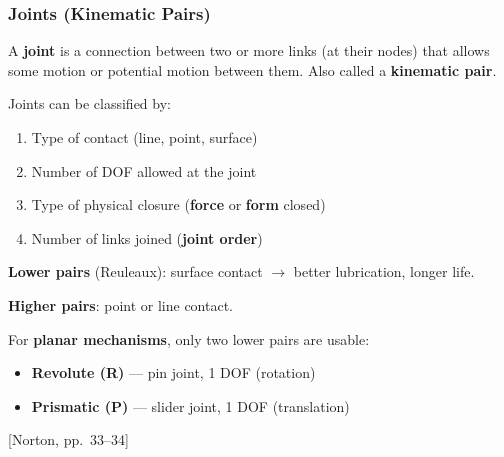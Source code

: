 \documentclass[10pt,aspectratio=43]{beamer}
\newcommand{\pref}[1]{\vfill\hfill{\scriptsize\color{gray}[Norton, pp.~#1]}}
\begin{document}
\begin{frame}
\frametitle{Joints (Kinematic Pairs)}

\begin{yellowbox}
A \textbf{joint} is a connection between two or more links (at their nodes) that allows some motion or potential motion between them. Also called a \textbf{kinematic pair}.
\end{yellowbox}

\vspace{4pt}
Joints can be classified by:
\begin{enumerate}
  \item Type of contact (line, point, surface)
  \item Number of DOF allowed at the joint
  \item Type of physical closure (\textbf{force} or \textbf{form} closed)
  \item Number of links joined (\textbf{joint order})
\end{enumerate}

\vspace{4pt}
\textbf{Lower pairs} (Reuleaux): surface contact $\to$ better lubrication, longer life.

\textbf{Higher pairs}: point or line contact.

\vspace{4pt}
For \textbf{planar mechanisms}, only two lower pairs are usable:
\begin{itemize}
  \item \textbf{Revolute (R)} --- pin joint, 1 DOF (rotation)
  \item \textbf{Prismatic (P)} --- slider joint, 1 DOF (translation)
\end{itemize}
\pref{33--34}
\end{frame}
\end{document}
